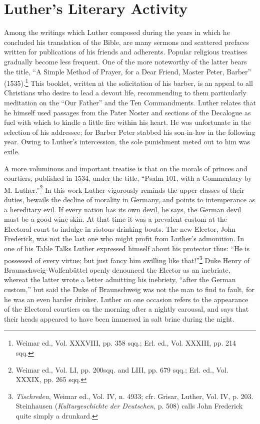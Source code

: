 \section{Luther’s Literary Activity}

Among the writings which Luther composed during the years in
which he concluded his translation of the Bible, are many sermons
and scattered prefaces written for publications of his friends and
adherents. Popular religious treatises gradually become less frequent.
One of the more noteworthy of the latter bears the title, “A Simple Method
of Prayer, for a Dear Friend, Master Peter, Barber”
(1535).\footnote{Weimar ed., Vol. XXXVIII, pp. 358 sqq.; Erl. ed., Vol. XXXIII, pp. 214 sqq.}
 This booklet, written at the solicitation of his barber, is an
appeal to all Christians who desire to lead a devout life, recommending
to them particularly meditation on the “Our Father” and the Ten
Commandments. Luther relates that he himself used passages from the
Pater Noster and sections of the Decalogue as fuel with which to
kindle a little fire within his heart. He was unfortunate in the selection
of his addressee; for Barber Peter stabbed his son-in-law in the
following year. Owing to Luther’s intercession, the sole punishment
meted out to him was exile.

A more voluminous and important treatise is that on the morals of
princes and courtiers, published in 1534, under the title, “Psalm 101,
with a Commentary by M. Luther.”\footnote
{Weimar ed., Vol. LI, pp. 200sqq. and LIII, pp. 679 sqq.; Erl. ed., Vol. XXXIX, pp.
265 sqq.}
In this work Luther vigorously reminds
the upper classes of their duties, bewails the decline
of morality in Germany, and points to intemperance as a hereditary
evil. If every nation has its own devil, he says, the German devil must
be a good wine-skin. At that time it was a prevalent custom at the
Electoral court to indulge in riotous drinking bouts. The new Elector,
John Frederick, was not the last one who might profit from Luther’s
admonition. In one of his Table Talks Luther expressed himself about
his protector thus: “He is possessed of every virtue; but just fancy
him swilling like that!”\footnote
{\textit{Tischreden}, Weimar ed., Vol. IV, n. 4933; cfr. Grisar, Luther, Vol. IV, p. 203.
Steinhausen (\textit{Kulturgeschichte der Deutschen}, p. 508) calls John Frederick quite simply a
drunkard.}
Duke Henry of Braunschweig-Wolfenbüttel
openly denounced the Elector as an inebriate, whereat the latter
wrote a letter admitting his inebriety, ``after the German custom,''
but said the Duke of Braunschweig was not the man to find to fault,
for he was an even harder drinker. Luther on one occasion refers to the
appearance of the Electoral courtiers on the morning after a nightly
carousal, and says that their heads appeared to have been immersed in
salt brine during the night.

